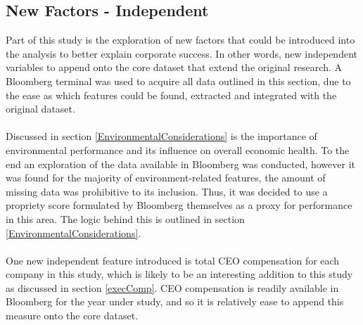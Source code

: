 \subsection{New Factors - Independent}
{Part of this study is the exploration of new factors that could be introduced into the analysis to better explain corporate success. In other words, new independent variables to append onto the core dataset that extend the original research. A Bloomberg terminal was used to acquire all data outlined in this section, due to the ease as which features could be found, extracted and integrated with the original dataset.}\\\\
{Discussed in section \ref{EnvironmentalConsiderations} is the importance of environmental performance and its influence on overall economic health. To the end an exploration of the data available in Bloomberg was conducted, however it was found for the majority of environment-related features, the amount of missing data was prohibitive to its inclusion. Thus, it was decided to use a propriety score formulated by Bloomberg themselves as a proxy for performance in this area. The logic behind this is outlined in section \ref{EnvironmentalConsiderations}.}\\\\
{One new independent feature introduced is total CEO compensation for each company in this study, which is likely to be an interesting addition to this study as discussed in section \ref{execComp}. CEO compensation is readily available in Bloomberg for the year under study, and so it is relatively ease to append this measure onto the core dataset.}
